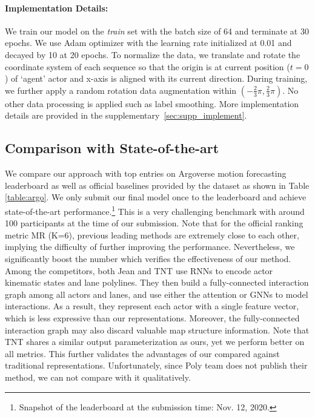 \paragraph{Implementation Details:}
We train our model on the \emph{train} set with the batch size of 64 and terminate at 30
epochs. We use Adam \cite{adam} optimizer with the learning rate initialized at 0.01 and decayed by 10 at 20 epochs. To normalize the data, we translate and rotate the coordinate system of each sequence so that
the origin is at current position ($t=0$) of `agent' actor and x-axis is aligned
with its current direction. During training, we further apply a random rotation
data augmentation within $(-\frac{2}{3}\pi, \frac{2}{3}\pi)$. No other data
processing is applied such as label smoothing. More implementation
details are provided in the supplementary~\ref{sec:supp_implement}.

\subsection{Comparison with State-of-the-art}
We compare our approach with top entries on Argoverse motion forecasting
leaderboard \cite{argoleaderboard} as well as official baselines provided
by the dataset \cite{argoverse} as shown in Table \ref{table:argo}. 
We only submit our final model once to the leaderboard and achieve
state-of-the-art performance.\footnote{Snapshot of the leaderboard at the submission time: Nov. 12, 2020.}
This is a very challenging benchmark
with around 100 participants at the time of our submission. Note that for the
official ranking metric MR (K=6), previous leading methods are extremely close to
each other, implying the difficulty of further improving the performance.
Nevertheless, we significantly boost the number which verifies the
effectiveness of our method. Among the competitors, both Jean
\cite{mercat2020multi} and TNT \cite{tnt} use RNNs to encode actor kinematic
states and lane polylines. They then build a fully-connected interaction graph
among all actors and lanes, and use either the attention or GNNs to model
interactions. As a result, they represent each actor with a single
feature vector, which is less expressive than our \ROI representations. Moreover,
the fully-connected interaction graph may also discard valuable map structure
information. Note that TNT shares a similar output parameterization as
ours, yet we perform better on all metrics. This further validates the advantages of
our \ROI compared against traditional representations. Unfortunately, since Poly team does
not publish their method, we can not compare with it qualitatively.


